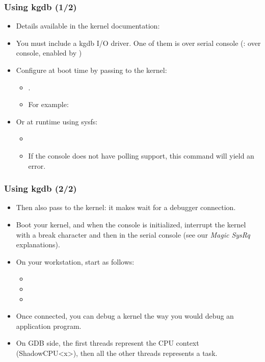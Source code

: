 \begin{frame}
  \frametitle{Using kgdb (1/2)}
  \begin{itemize}
  \item Details available in the kernel documentation:
  \item You must include a kgdb I/O driver. One of them is  over
    serial console (:  over console, enabled by
    )
  \item Configure  at boot time by passing to the kernel:
    \begin{itemize}
    \item {}.
    \item For example: 
    \end{itemize}
  \item Or at runtime using sysfs:
   \begin{itemize}
   \item {}
   \item If the console does not have polling support, this command will yield
         an error.
   \end{itemize}
  \end{itemize}
\end{frame}

\begin{frame}
  \frametitle{Using kgdb (2/2)}
  \begin{itemize}
  \item Then also pass  to the kernel: it makes
     wait for a debugger connection.
  \item Boot your kernel, and when the console is initialized,
    interrupt the kernel with a break character and then 
    in the serial console (see our {\em Magic SysRq} explanations).
  \item On your workstation, start  as follows:
    \begin{itemize}
    \item {}
    \item {}
    \item {}
    \end{itemize}
  \item Once connected, you can debug a kernel the way you would debug
    an application program.
  \item On GDB side, the first threads represent the CPU context (ShadowCPU<x>),
    then all the other threads represents a task.
  \end{itemize}
\end{frame}